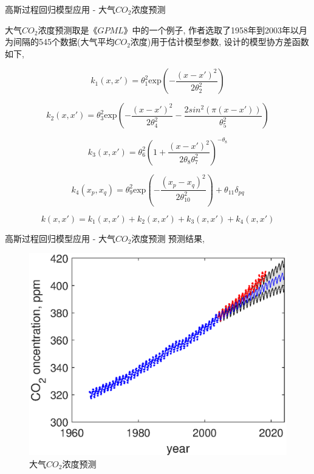 \documentclass[10pt,mathserif]{beamer}
\theoremstyle{definition}
\numberwithin{equation}{section} %
\begin{document}
    \begin{frame}{高斯过程回归模型应用 - 大气$CO_{2}$浓度预测}

        大气$CO_{2}$浓度预测取是《$GPML$》中的一个例子, 作者选取了1958年到2003年以月为间隔的545个数据(大气平均$CO_{2}$浓度)用于估计模型参数, 设计的模型协方差函数如下, 

        $$k_{1}(x,x')=\theta^{2}_{1}\mathrm{exp}\left(-\frac{(x-x')^{2}}{2\theta^{2}_{2}}\right)$$

        $$k_{2}(x,x')=\theta^{2}_{3}\mathrm{exp}\left(-\frac{(x-x')^{2}}{2\theta^{2}_{4}}-\frac{2sin^{2}(\pi(x-x'))}{\theta^{2}_{5}}\right)$$

        $$k_{3}(x,x')=\theta^{2}_{6}\left(1+\frac{(x-x')^{2}}{2\theta_{8}\theta^{2}_{7}}\right)^{-\theta_{8}}$$

        $$k_{4}(x_{p},x_{q})=\theta^{2}_{9}\mathrm{exp}\left(-\frac{(x_{p}-x_{q})^{2}}{2\theta^{2}_{10}}\right)+\theta_{11}\delta_{pq}$$

        $$k(x,x')=k_{1}(x,x')+k_{2}(x,x')+k_{3}(x,x')+k_{4}(x,x')$$

    \end{frame}

    \begin{frame}{高斯过程回归模型应用 - 大气$CO_{2}$浓度预测}
        预测结果,
        \vspace{-1ex}
        \begin{figure}[H]
            \centering
            \includegraphics[scale=0.5]{fig/co2.eps} 
            \caption{$大气CO_{2}$浓度预测}
        \end{figure}
    \end{frame}
\end{document}
